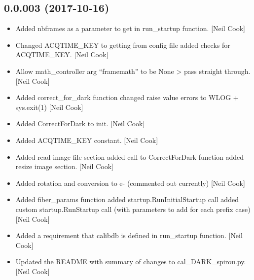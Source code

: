 \documentclass[a4paper,10pt,english]{report}
\begin{document}
\subsection{0.0.003 (2017-10-16)}
\label{\detokenize{misc/changelog:id546}}\begin{itemize}
\item {} 
Added nbframes as a parameter to get in run\_startup function. {[}Neil
Cook{]}

\item {} 
Changed ACQTIME\_KEY to getting from config file added checks for
ACQTIME\_KEY. {[}Neil Cook{]}

\item {} 
Allow math\_controller arg “framemath” to be None \textendash{}\textgreater{} pass straight
through. {[}Neil Cook{]}

\item {} 
Added correct\_for\_dark function changed raise value errors to WLOG +
sys.exit(1) {[}Neil Cook{]}

\item {} 
Added CorrectForDark to init. {[}Neil Cook{]}

\item {} 
Added ACQTIME\_KEY constant. {[}Neil Cook{]}

\item {} 
Added read image file section added call to CorrectForDark function
added resize image section. {[}Neil Cook{]}

\item {} 
Added rotation and conversion to e- (commented out currently) {[}Neil
Cook{]}

\item {} 
Added fiber\_params function added startup.RunInitialStartup call added
custom startup.RunStartup call (with parameters to add for each prefix
case) {[}Neil Cook{]}

\item {} 
Added a requirement that calibdb is defined in run\_startup function.
{[}Neil Cook{]}

\item {} 
Updated the README with summary of changes to cal\_DARK\_spirou.py.
{[}Neil Cook{]}

\end{itemize}
\end{document}
